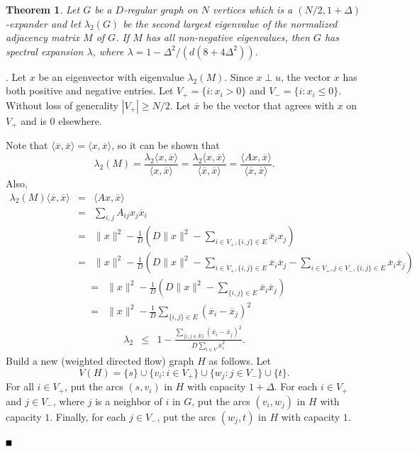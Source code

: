 \documentclass{article}
\newtheorem{theorem}{Theorem}[section]
\newcommand{\bproof}{\noindent{\bf Proof}}
\newcommand{\eproof}{\hspace*{\fill}$\rule{2mm}{2mm}$~~~~\bigskip}
\renewenvironment{proof}{\bproof. }{\eproof}
\begin{document}
\begin{theorem}\label{bipartiteverteximpliesspectral}
Let $G$ be a $D$-regular graph on $N$ vertices which is a $(N/2,1+\Delta )$-expander and let $\lambda_2(G)$ be the second largest eigenvalue of the normalized adjacency matrix $M$ of $G$. If $M$ has all non-negative eigenvalues, then $G$ has spectral expansion $\lambda$, where $\lambda =1-\Delta^2/(d(8+4\Delta^2))$.
\end{theorem}
\begin{proof}
Let $x$ be an eigenvector with eigenvalue $\lambda_2(M)$. Since $x\perp u$, the vector $x$ has both positive and negative entries. Let $V_+=\{i:x_i>0\}$ and $V_-=\{i:x_i\leq 0\}$. Without loss of generality $|V_+|\geq N/2$. Let $\overline{x}$ be the vector that agrees with $x$ on $V_+$ and is $0$ elsewhere.

Note that $\langle \overline{x},\overline{x}\rangle =\langle x,\overline{x}\rangle$, so it can be shown that
\[
\lambda_2(M)=\frac{\lambda_2\langle x,\overline{x}\rangle}{\langle x,\overline{x}\rangle}=\frac{\lambda_2\langle x,\overline{x}\rangle}{\langle\overline{x},\overline{x}\rangle}=\frac{\langle Ax,\overline{x}\rangle}{\langle\overline{x},\overline{x}\rangle}.
\]
Also,
\begin{eqnarray*}
\lambda_2(M)\langle\overline{x},\overline{x}\rangle & = & \langle Ax,\overline{x}\rangle\\
 & = & \sum_{i,j}A_{ij}x_j\overline{x}_i\\
 & = & \| x\|^2-\frac{1}{D}\left (D\| x\|^2-\sum_{i\in V_+,\{ i,j\}\in E}\overline{x}_ix_j\right )\\
 & = & \| x\|^2-\frac{1}{D}\left (D\| x\|^2-\sum_{i\in V_+,\{ i,j\}\in E}\overline{x}_i\overline{x}_j-\sum_{i\in V_+,j\in V_-,\{ i,j\}\in E}\overline{x}_i\overline{x}_j\right )
\end{eqnarray*}
\begin{eqnarray*}
 & = & \| x\|^2-\frac{1}{D}\left (D\| x\|^2-\sum_{\{ i,j\}\in E}\overline{x}_i\overline{x}_j\right )\\
 & = & \| x\|^2-\frac{1}{D}\sum_{\{ i,j\}\in E} (\overline{x}_i-\overline{x}_j)^2
\end{eqnarray*}
\begin{eqnarray}\label{maxflowmincutlambdaequation}
\lambda_2 & \leq & 1-\frac{\sum_{\{ i,j\in E \}}(\overline{x}_i-\overline{x}_j)^2}{D\sum_{i\in V}\overline{x}_i^2}.
\end{eqnarray}
Build a new (weighted directed flow) graph $H$ as follows. Let
\[
V(H)=\{ s\}\cup\{ v_i:i\in V_+\}\cup\{w_j:j\in V_-\}\cup\{ t\}.
\]
For all $i\in V_+$, put the arcs $(s,v_i)$ in $H$ with capacity $1+\Delta$. For each $i\in V_+$ and $j\in V_-$, where $j$ is a neighbor of $i$ in $G$, put the arcs $(v_i,w_j)$ in $H$ with capacity $1$. Finally, for each $j\in V_-$, put the arcs $(w_j,t)$ in $H$ with capacity $1$.


\end{proof}
\end{document}
